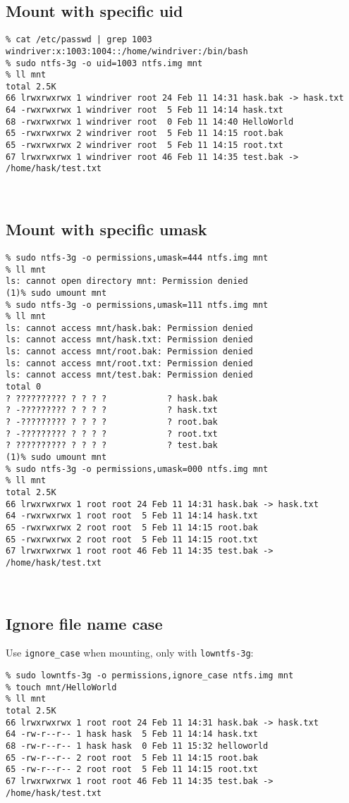 \documentclass[a4paper]{report}
\begin{document}
\subsection{Mount with specific uid}
\begin{lstlisting}
% cat /etc/passwd | grep 1003         
windriver:x:1003:1004::/home/windriver:/bin/bash
% sudo ntfs-3g -o uid=1003 ntfs.img mnt
% ll mnt
total 2.5K
66 lrwxrwxrwx 1 windriver root 24 Feb 11 14:31 hask.bak -> hask.txt
64 -rwxrwxrwx 1 windriver root  5 Feb 11 14:14 hask.txt
68 -rwxrwxrwx 1 windriver root  0 Feb 11 14:40 HelloWorld
65 -rwxrwxrwx 2 windriver root  5 Feb 11 14:15 root.bak
65 -rwxrwxrwx 2 windriver root  5 Feb 11 14:15 root.txt
67 lrwxrwxrwx 1 windriver root 46 Feb 11 14:35 test.bak -> /home/hask/test.txt
\end{lstlisting}\null\\
\subsection{Mount with specific umask}
\begin{lstlisting}
% sudo ntfs-3g -o permissions,umask=444 ntfs.img mnt
% ll mnt                                     
ls: cannot open directory mnt: Permission denied
(1)% sudo umount mnt                          
% sudo ntfs-3g -o permissions,umask=111 ntfs.img mnt
% ll mnt                                           
ls: cannot access mnt/hask.bak: Permission denied
ls: cannot access mnt/hask.txt: Permission denied
ls: cannot access mnt/root.bak: Permission denied
ls: cannot access mnt/root.txt: Permission denied
ls: cannot access mnt/test.bak: Permission denied
total 0
? ?????????? ? ? ? ?            ? hask.bak
? -????????? ? ? ? ?            ? hask.txt
? -????????? ? ? ? ?            ? root.bak
? -????????? ? ? ? ?            ? root.txt
? ?????????? ? ? ? ?            ? test.bak
(1)% sudo umount mnt                               
% sudo ntfs-3g -o permissions,umask=000 ntfs.img mnt
% ll mnt             
total 2.5K
66 lrwxrwxrwx 1 root root 24 Feb 11 14:31 hask.bak -> hask.txt
64 -rwxrwxrwx 1 root root  5 Feb 11 14:14 hask.txt
65 -rwxrwxrwx 2 root root  5 Feb 11 14:15 root.bak
65 -rwxrwxrwx 2 root root  5 Feb 11 14:15 root.txt
67 lrwxrwxrwx 1 root root 46 Feb 11 14:35 test.bak -> /home/hask/test.txt
\end{lstlisting}\null\\
\subsection{Ignore file name case}
Use {\tt ignore\_case} when mounting, only with {\tt lowntfs-3g}:
\begin{lstlisting}
% sudo lowntfs-3g -o permissions,ignore_case ntfs.img mnt
% touch mnt/HelloWorld
% ll mnt
total 2.5K
66 lrwxrwxrwx 1 root root 24 Feb 11 14:31 hask.bak -> hask.txt
64 -rw-r--r-- 1 hask hask  5 Feb 11 14:14 hask.txt
68 -rw-r--r-- 1 hask hask  0 Feb 11 15:32 helloworld
65 -rw-r--r-- 2 root root  5 Feb 11 14:15 root.bak
65 -rw-r--r-- 2 root root  5 Feb 11 14:15 root.txt
67 lrwxrwxrwx 1 root root 46 Feb 11 14:35 test.bak -> /home/hask/test.txt
\end{lstlisting}\null\\
\end{document}
